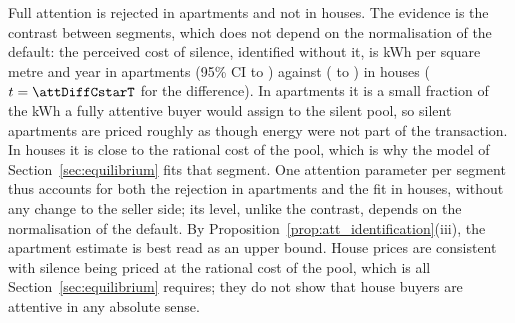 Full attention is rejected in apartments and not in houses. The evidence is the contrast between segments, which does not depend on the normalisation of the default: the perceived cost of silence, identified without it, is \attCstarApt{} kWh per square metre and year in apartments (95\% CI \attCstarLoApt{} to \attCstarHiApt{}) against \attCstarHouse{} (\attCstarLoHouse{} to \attCstarHiHouse{}) in houses ($t=\attDiffCstarT$ for the difference). In apartments it is a small fraction of the \attCsilApt{} kWh a fully attentive buyer would assign to the silent pool, so silent apartments are priced roughly as though energy were not part of the transaction. In houses it is close to the rational cost of the pool, which is why the model of Section~\ref{sec:equilibrium} fits that segment. One attention parameter per segment thus accounts for both the rejection in apartments and the fit in houses, without any change to the seller side; its level, unlike the contrast, depends on the normalisation of the default. By Proposition~\ref{prop:att_identification}(iii), the apartment estimate is best read as an upper bound. House prices are consistent with silence being priced at the rational cost of the pool, which is all Section~\ref{sec:equilibrium} requires; they do not show that house buyers are attentive in any absolute sense.
